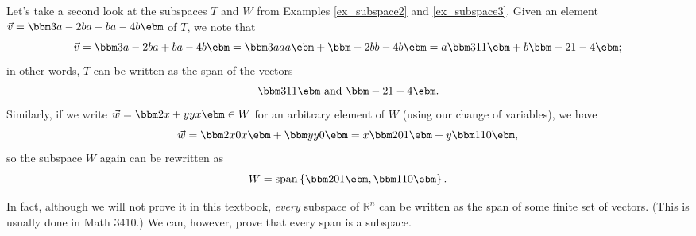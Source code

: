 Let's take a second look at the subspaces $T$ and $W$ from Examples \ref{ex_subspace2} and \ref{ex_subspace3}. Given an element $\vec v = \bbm 3a-2b\\a+b\\a-4b\ebm$ of $T$, we note that
\[
\vec v = \bbm 3a-2b\\a+b\\a-4b\ebm = \bbm 3a\\a\\a\ebm + \bbm -2b\\b\\-4b\ebm = a\bbm 3\\1\\1\ebm + b\bbm -2\\1\\-4\ebm;
\]
in other words, $T$ can be written as the span of the vectors
\[
\bbm 3\\1\\1\ebm \text{ and } \bbm -2\\1\\-4\ebm.
\]
Similarly, if we write $\vec w = \bbm 2x+y\\y\\x\ebm\in W$ for an arbitrary element of $W$ (using our change of variables), we have
\[
\vec w = \bbm 2x\\0\\x\ebm + \bbm y\\y\\0\ebm = x\bbm 2\\0\\1\ebm + y\bbm 1\\1\\0\ebm,
\]
so the subspace $W$ again can be rewritten as
\[
W = \operatorname{span}\left\{\bbm 2\\0\\1\ebm, \bbm 1\\1\\0\ebm\right\}.
\]

In fact, although we will not prove it in this textbook, \textit{every} subspace of $\mathbb{R}^n$ can be written as the span of some finite set of vectors. (This is usually done in Math 3410.) We can, however, prove that every span is a subspace.

\smallskip


